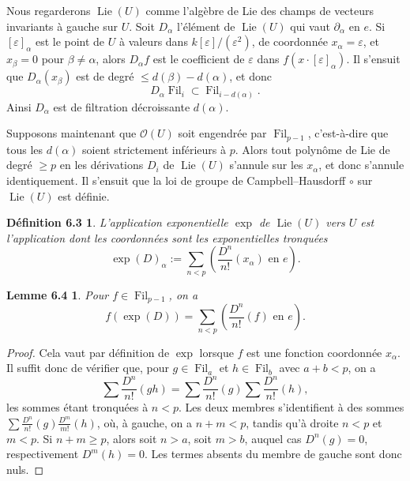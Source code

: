 \documentclass[11pt]{article}
\newcommand{\Lie}{\operatorname{Lie}}
\providecommand{\Fil}{\operatorname{Fil}}
\newtheorem*{definition63}{Définition 6.3}
\newtheorem*{lemme64}{Lemme 6.4}
\providecommand{\OO}{\mathcal O}
\begin{document}
Nous regarderons \(\Lie(U)\) comme l'algèbre de Lie des champs de vecteurs invariants à gauche
sur \(U\). Soit \(D_\alpha\) l'élément de \(\Lie(U)\) qui vaut \(\partial_\alpha\) en \(e\). Si
\([\varepsilon]_\alpha\) est le point de \(U\) à valeurs dans \(k[\varepsilon]/(\varepsilon^2)\), de coordonnée
\(x_\alpha=\varepsilon\), et \(x_\beta=0\) pour \(\beta\ne\alpha\), alors \(D_\alpha f\) est le
coefficient de \(\varepsilon\) dans \(f(x\cdot[\varepsilon]_\alpha)\). Il s'ensuit que
\(D_\alpha(x_\beta)\) est de degré \(\le d(\beta)-d(\alpha)\), et donc
\begin{equation}
  D_\alpha\Fil_i\subset \Fil_{i-d(\alpha)}.
  \tag{6.2.2}
\end{equation}
Ainsi \(D_\alpha\) est de filtration décroissante \(d(\alpha)\).

Supposons maintenant que \(\OO(U)\) soit engendrée par \(\Fil_{p-1}\), c'est-à-dire que tous les
\(d(\alpha)\) soient strictement inférieurs à \(p\). Alors tout polynôme de Lie de degré \(\ge p\)
en les dérivations \(D_i\) de \(\Lie(U)\) s'annule sur les \(x_\alpha\), et donc s'annule
identiquement. Il s'ensuit que la loi de groupe de Campbell--Hausdorff \(\circ\) sur \(\Lie(U)\) est
définie.

\begin{definition63}
L'application exponentielle \(\exp\) de \(\Lie(U)\) vers \(U\) est l'application dont les coordonnées
sont les exponentielles tronquées
\begin{equation}
  \exp(D)_\alpha:=\sum_{n<p}\left(\frac{D^n}{n!}(x_\alpha)\text{ en }e\right).
  \tag{6.3.1}
\end{equation}
\end{definition63}

\begin{lemme64}
Pour \(f\in\Fil_{p-1}\), on a
\begin{equation}
  f(\exp(D))=\sum_{n<p}\left(\frac{D^n}{n!}(f)\text{ en }e\right).
  \tag{6.4.1}
\end{equation}
\end{lemme64}

\begin{proof}
Cela vaut par définition de \(\exp\) lorsque \(f\) est une fonction coordonnée \(x_\alpha\). Il suffit donc
de vérifier que, pour \(g\in\Fil_a\) et \(h\in\Fil_b\) avec \(a+b<p\), on a
\begin{equation}
  \sum\frac{D^n}{n!}(gh)=\sum\frac{D^n}{n!}(g)\sum\frac{D^n}{n!}(h),
  \tag{6.4.2}
\end{equation}
les sommes étant tronquées à \(n<p\). Les deux membres s'identifient à des sommes
\(\sum \frac{D^n}{n!}(g)\frac{D^m}{m!}(h)\), où, à gauche, on a \(n+m<p\), tandis qu'à droite
\(n<p\) et \(m<p\). Si \(n+m\ge p\), alors soit \(n>a\), soit \(m>b\), auquel cas
\(D^n(g)=0\), respectivement \(D^m(h)=0\). Les termes absents du membre de gauche sont donc
nuls.
\end{proof}
\end{document}
